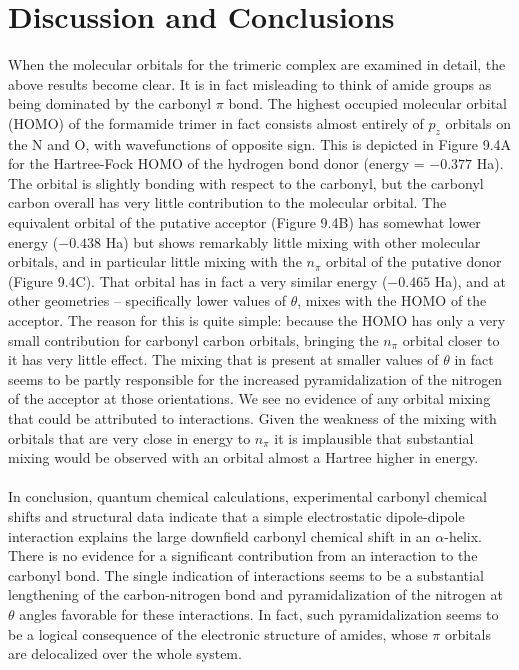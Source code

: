 \section{Discussion and Conclusions}

\begin{doublespace}
When the molecular orbitals for the trimeric complex are examined in detail, 
the above results become clear. It is in fact misleading to think of amide 
groups as being dominated by the carbonyl $\pi$ bond. The highest occupied
molecular orbital (HOMO) of the formamide trimer in fact consists almost
entirely of $p_z$ orbitals on the N and O, with wavefunctions of opposite sign.
This is depicted in Figure 9.4A for the Hartree-Fock HOMO of the hydrogen bond
donor (energy = $-0.377$ Ha). The orbital is slightly bonding with respect to
the carbonyl, but the carbonyl carbon overall has very little contribution to
the molecular orbital. The equivalent orbital of the putative acceptor
(Figure 9.4B) has somewhat lower energy ($-0.438$ Ha) but shows remarkably
little mixing with other molecular orbitals, and in particular little mixing
with the $n_\pi$ orbital of the putative \npipistar{} donor (Figure 9.4C). That
orbital has in fact a very similar energy ($-0.465$ Ha), and at other
geometries -- specifically lower values of $\theta$, mixes with the HOMO of
the acceptor. The reason for this is quite simple: because the HOMO has only a
very small contribution for carbonyl carbon orbitals, bringing the $n_\pi$
orbital closer to it has very little effect. The mixing that is present at
smaller values of $\theta$ in fact seems to be partly responsible for the
increased pyramidalization of the nitrogen of the acceptor at those
orientations. We see no evidence of any orbital mixing that could be attributed
to \npipistar{} interactions. Given the weakness of the mixing with orbitals
that are very close in energy to $n_\pi$ it is implausible that substantial
mixing would be observed with an orbital almost a Hartree higher in energy.
\\\\
In conclusion, quantum chemical calculations, experimental carbonyl \cnmr{}
chemical shifts and structural data indicate that a simple electrostatic
dipole-dipole interaction explains the large downfield carbonyl \cnmr{}
chemical shift in an $\alpha$-helix. There is no evidence for a significant
contribution from an \npistar{} interaction to the carbonyl bond. The single
indication of \npistar{} interactions seems to be a substantial lengthening of
the carbon-nitrogen bond and pyramidalization of the nitrogen at $\theta$
angles favorable for these interactions. In fact, such pyramidalization seems
to be a logical consequence of the electronic structure of amides, whose $\pi$
orbitals are delocalized over the whole system.
\end{doublespace}




